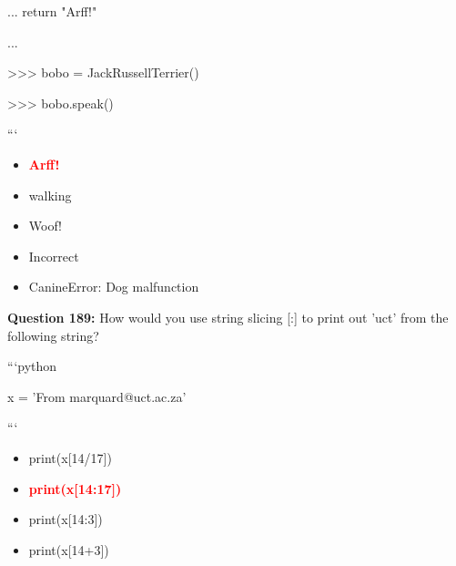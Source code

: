 \documentclass[12pt,a4paper]{article}
\begin{document}
\newline
...         return "Arff!"\newline

\newline
...\newline

\newline
>>> bobo = JackRussellTerrier()\newline

\newline
>>> bobo.speak()\newline

\newline
```

\begin{itemize}
    \item[\textbf{A.}] \textcolor{red}{\textbf{Arff!}}
    \item[\textbf{B.}] walking
    \item[\textbf{C.}] Woof!
    \item[\textbf{D.}] Incorrect
    \item[\textbf{E.}] CanineError: Dog malfunction
\end{itemize}

\vspace{0.5cm}

\textbf{Question 189:} How would you use string slicing [:] to print out 'uct' from the following string?\newline

\newline
\newline

\newline
```python\newline

\newline
x = 'From marquard@uct.ac.za'\newline

\newline
```

\begin{itemize}
    \item[\textbf{A.}] print(x[14/17])
    \item[\textbf{B.}] \textcolor{red}{\textbf{print(x[14:17])}}
    \item[\textbf{C.}] print(x[14:3])
    \item[\textbf{D.}] print(x[14+3])
\end{itemize}
\end{document}

